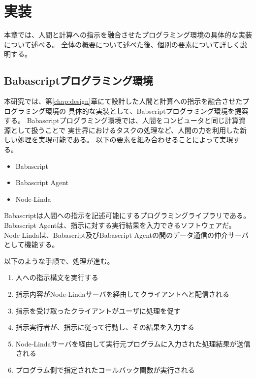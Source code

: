 \chapter{実装}\label{chap:implementation}

本章では、人間と計算への指示を融合させたプログラミング環境の具体的な実装について述べる。
全体の概要について述べた後、個別の要素について詳しく説明する。

\section{Babascriptプログラミング環境}\label{babascriptux30d7ux30edux30b0ux30e9ux30dfux30f3ux30b0ux74b0ux5883}

本研究では、第\ref{chap:design}章にて設計した人間と計算への指示を融合させたプログラミング環境の
具体的な実装として、Babscriptプログラミング環境を提案する。
Babascriptプログラミング環境では、人間をコンピュータと同じ計算資源として扱うことで
実世界におけるタスクの処理など、人間の力を利用した新しい処理を実現可能である。
以下の要素を組み合わせることによって実現する。

\begin{itemize}
\itemsep1pt\parskip0pt
\item
  Babascript
\item
  Babascript Agent
\item
  Node-Linda
\end{itemize}

Babascriptは人間への指示を記述可能にするプログラミングライブラリである。
Babascript Agentは、指示に対する実行結果を入力できるソフトウェアだ。
Node-Lindaは、Babascript及びBabascript
Agentの間のデータ通信の仲介サーバとして機能する。

以下のような手順で、処理が進む。

\begin{enumerate}
\def\labelenumi{\arabic{enumi}.}
\itemsep1pt\parskip0pt
\item
  人への指示構文を実行する
\item
  指示内容がNode-Lindaサーバを経由してクライアントへと配信される
\item
  指示を受け取ったクライアントがユーザに処理を促す
\item
  指示実行者が、指示に従って行動し、その結果を入力する
\item
  Node-Lindaサーバを経由して実行元プログラムに入力された処理結果が送信される
\item
  プログラム側で指定されたコールバック関数が実行される
\end{enumerate}

